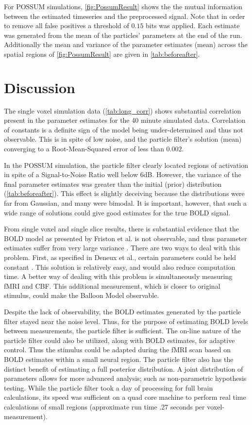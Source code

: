 \documentclass{article}
\begin{document}
For POSSUM simulations, \autoref{fig:PossumResult} shows the
the mutual information between the estimated timeseries and the 
preprocessed signal. Note that in order to remove all false
positives a threshold of $0.15$ bits was applied.
Each estimate was generated from the 
mean of the particles' parameters at the end of the run. 
Additionally the mean and variance of the parameter estimates
(mean) across the spatial regions of \autoref{fig:PossumResult} are
given in \autoref{tab:beforeafter}.

\section{Discussion}
\label{sec:Conclusion}
The single voxel simulation data (\autoref{tab:long_corr}) 
shows substantial correlation present in the parameter 
estimates for the 40 minute simulated data. Correlation of 
constants is a definite sign of the model being under-determined
and thus not observable. This is in spite of low noise, and the 
particle filter's solution (mean) converging to a Root-Mean-Squared error
of less than $0.002$. 

In the \ac{POSSUM} simulation, the particle filter clearly
located regions of activation in spite of a Signal-to-Noise Ratio 
well below 6dB. However, the variance of the final parameter estimates 
was greater than the initial (prior) distribution (\autoref{tab:beforeafter}).
This effect is slightly deceiving because the distributions
were far from Gaussian, and many were bimodal. It is 
important, however, that such a wide range of solutions
could give good estimates for the true BOLD signal. 

From single voxel and single slice results, 
there is substantial evidence that the BOLD model as presented
by Friston et al. is not observable, and thus parameter estimates
suffer from very large variance \cite{Friston2000}.  
There are two ways to deal with this problem. First, as
specified in Deneux et al., certain parameters could be held constant
\cite{Deneux2006}. This solution is relatively easy, and would
also reduce computation time. A better way of dealing with this 
problem is simultaneously measuring fMRI and \ac{CBF}.  
This additional measurement, which is closer to 
original stimulus, could make the Balloon Model observable.

Despite the lack of observability, the BOLD estimates generated 
by the particle filter stayed near the noise level. 
Thus, for the purpose of estimating BOLD levels between measurements,
the particle filter is sufficient. The on-line nature of the
particle filter could also be utilized, along with BOLD estimates,
for adaptive control. Thus the stimulus could be
adapted during the fMRI scan based on BOLD estimates within a small neural
region. The particle filter also has the distinct benefit of 
estimating a full posterior distribution. A joint distribution of 
parameters allows for more advanced analysis; such as 
non-parametric hypothesis testing.  
While the particle filter took a day of processing for full brain calculations, its speed
was sufficient on a quad core machine to perform real time calculations of small regions
(approximate run time .27 seconds per voxel-measurement). 



\end{document}
